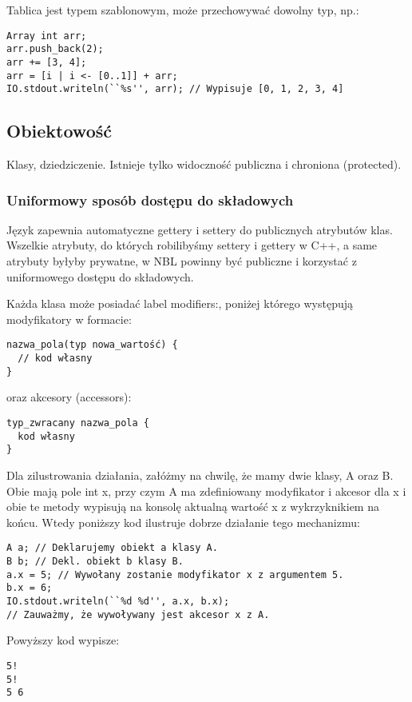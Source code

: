 \documentclass[a4paper,10pt]{scrartcl}
\begin{document}
Tablica jest typem szablonowym, może przechowywać dowolny typ, np.:
\begin{lstlisting}
Array int arr;
arr.push_back(2);
arr += [3, 4];
arr = [i | i <- [0..1]] + arr;
IO.stdout.writeln(``%s'', arr);	// Wypisuje [0, 1, 2, 3, 4]
\end{lstlisting}

\subsection{Obiektowość}
Klasy, dziedziczenie. Istnieje tylko widoczność publiczna i chroniona (protected). 

\subsubsection{Uniformowy sposób dostępu do składowych}
Język zapewnia automatyczne gettery i settery do publicznych atrybutów klas. Wszelkie atrybuty, do których robilibyśmy settery i gettery w C++, a
same atrybuty byłyby prywatne, w NBL powinny być publiczne i korzystać z uniformowego dostępu do składowych.

Każda klasa może posiadać label modifiers:, poniżej którego występują modyfikatory w formacie:
\begin{lstlisting}
nazwa_pola(typ nowa_wartość) {
  // kod własny
}
\end{lstlisting}

oraz akcesory (accessors):
\begin{lstlisting}
typ_zwracany nazwa_pola {
  kod własny
}
\end{lstlisting}

Dla zilustrowania działania, załóżmy na chwilę, że mamy dwie klasy, A oraz B. Obie mają pole int x, przy czym A ma zdefiniowany modyfikator i
akcesor dla x i obie te metody wypisują na konsolę aktualną wartość x z wykrzyknikiem na końcu. Wtedy poniższy kod ilustruje dobrze działanie
tego mechanizmu:
\begin{lstlisting}
A a; // Deklarujemy obiekt a klasy A.
B b; // Dekl. obiekt b klasy B.
a.x = 5; // Wywołany zostanie modyfikator x z argumentem 5.
b.x = 6;
IO.stdout.writeln(``%d %d'', a.x, b.x); 
// Zauważmy, że wywoływany jest akcesor x z A.
\end{lstlisting}

Powyższy kod wypisze:
\begin{lstlisting}
5!
5!
5 6
\end{lstlisting}
\end{document}
